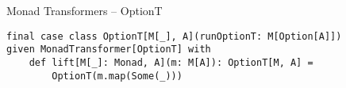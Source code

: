 \documentclass[presentation, 10pt]{beamer}\mode<presentation>{\usetheme{AMSBolognaFC}}
\begin{document}
\begin{frame}[fragile]{Monad Transformers -- OptionT}
	\begin{center}
	\end{center}
\begin{tcolorbox}
\begin{verbatim}
final case class OptionT[M[_], A](runOptionT: M[Option[A]])
given MonadTransformer[OptionT] with 
	def lift[M[_]: Monad, A](m: M[A]): OptionT[M, A] = 
		OptionT(m.map(Some(_)))
\end{verbatim}
\end{tcolorbox}
\end{frame}
\end{document}
